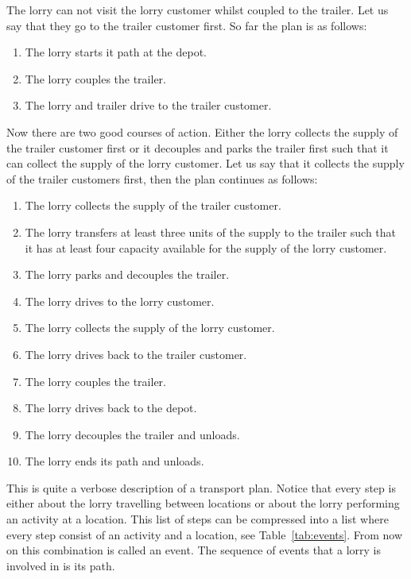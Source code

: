 The lorry can not visit the lorry customer whilst coupled to the trailer.
Let us say that they go to the trailer customer first. So far the plan is as follows:
\begin{enumerate}
  \item The lorry starts it path at the depot.
  \item The lorry couples the trailer.
  \item The lorry and trailer drive to the trailer customer.
\end{enumerate}
Now there are two good courses of action.
Either the lorry collects the supply of the trailer customer first or it decouples and parks the trailer first such that it can collect the supply of the lorry customer.
Let us say that it collects the supply of the trailer customers first, then the plan continues as follows:
\begin{enumerate}[resume]
  \item The lorry collects the supply of the trailer customer.
  \item The lorry transfers at least three units of the supply to the trailer such that it has at least four capacity available for the supply of the lorry customer.
  \item The lorry parks and decouples the trailer.
  \item The lorry drives to the lorry customer.
  \item The lorry collects the supply of the lorry customer.
  \item The lorry drives back to the trailer customer.
  \item The lorry couples the trailer.
  \item The lorry drives back to the depot.
  \item The lorry decouples the trailer and unloads.
  \item The lorry ends its path and unloads.

\end{enumerate}


This is quite a verbose description of a transport plan.
Notice that every step is either about the lorry travelling between locations or about the lorry performing an activity at a location.
This list of steps can be compressed into a list where every step consist of an activity and a location, see Table~\ref{tab:events}.
From now on this combination is called an event. The sequence of events that a lorry is involved in is its path.

